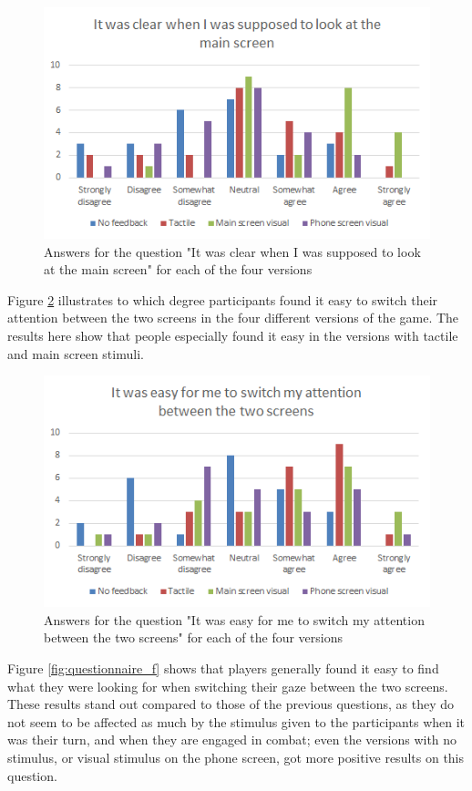 \begin{figure}[h!]
	\centering
	\includegraphics[scale=1]{figures/questionnaire_d.png}
	\caption{Answers for the question "It was clear when I was supposed to look at the main screen" for each of the four versions}\label{fig:questionnaire_d}
\end{figure}

Figure \ref{fig:questionnaire_e} illustrates to which degree participants found it easy to switch their attention between the two screens in the four different versions of the game. The results here show that people especially found it easy in the versions with tactile and main screen stimuli.

\begin{figure}[h!]
	\centering
	\includegraphics[scale=1]{figures/questionnaire_e.png}
	\caption{Answers for the question "It was easy for me to switch my attention between the two screens" for each of the four versions}\label{fig:questionnaire_e}
\end{figure}

Figure \ref{fig:questionnaire_f} shows that players generally found it easy to find what they were looking for when switching their gaze between the two screens. These results stand out compared to those of the previous questions, as they do not seem to be affected as much by the stimulus given to the participants when it was their turn, and when they are engaged in combat; even the versions with no stimulus, or visual stimulus on the phone screen, got more positive results on this question.

